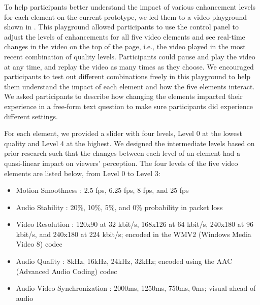 To help participants better understand the impact of various enhancement levels for each element on the current prototype, we led them to a video playground shown in . This playground allowed participants to use the control panel to adjust the levels of enhancements for all five video elements and see real-time changes in the video on the top of the page, i.e., the video played in the most recent combination of quality levels. Participants could pause and play the video at any time, and replay the video as many times as they choose. We encouraged participants to test out different combinations freely in this playground to help them understand the impact of each element and how the five elements interact. We asked participants to describe how changing the elements impacted their experience in a free-form text question to make sure participants did experience different settings.


For each element, we provided a slider with four levels, Level 0 at the lowest quality and Level 4 at the highest. We designed the intermediate levels based on prior research such that the changes between each level of an element had a quasi-linear impact on viewers' perception. The four levels of the five video elements are listed below, from Level 0 to Level 3:
\begin{itemize}
    \item Motion Smoothness \cite{huynh2008temporal}: 2.5 fps, 6.25 fps, 8 fps, and 25 fps
    \item Audio Stability \cite{hardman1998successful}: 20\%, 10\%, 5\%, and 0\% probability in packet loss
    \item Video Resolution \cite{knoche2005can}: 120x90 at 32 kbit/s, 168x126 at 64 kbit/s, 240x180 at 96 kbit/s, and 240x180 at 224 kbit/s; encoded in the WMV2 (Windows Media Video 8) codec 
    \item Audio Quality \cite{knoche2008low, noll1993wideband}: 8kHz, 16kHz, 24kHz, 32kHz; encoded using the AAC (Advanced Audio Coding) codec
    \item Audio-Video Synchronization \cite{steinmetz1996human}: 2000ms, 1250ms, 750ms, 0ms; visual ahead of audio
\end{itemize}


